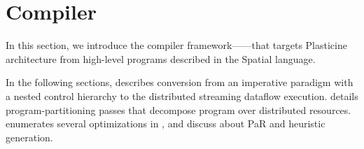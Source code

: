 \chapter{Compiler} \label{sec:compiler}

In this section, we introduce the compiler framework---\name---that targets Plasticine
architecture from high-level programs described in the Spatial language. 

In the following sections,  describes conversion from an imperative paradigm with
a nested control hierarchy to the distributed streaming dataflow execution.
 details program-partitioning passes that decompose program over distributed resources.
 enumerates several optimizations in \name, and  discuss about PaR and
heuristic generation.
